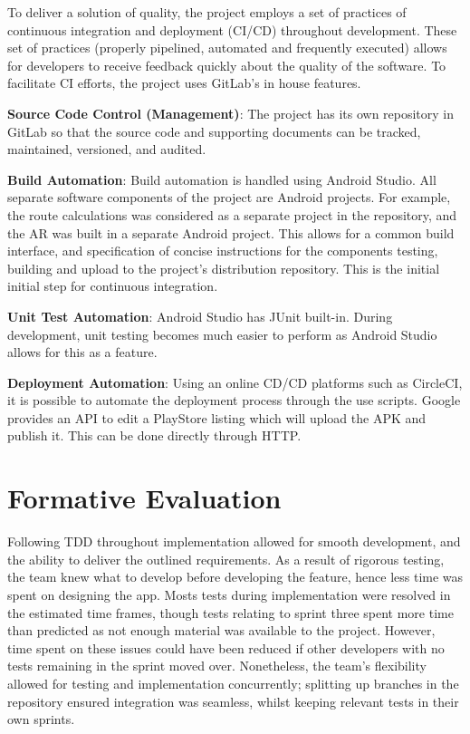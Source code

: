 To deliver a solution of quality, the project employs a set of practices of continuous integration and deployment (CI/CD) throughout development. These set of practices (properly pipelined, automated and frequently executed) allows for developers to receive feedback quickly about the quality of the software. To facilitate CI efforts, the project uses GitLab's in house features.

\textbf{Source Code Control (Management)}: The project has its own repository in GitLab so that the source code and supporting documents can be tracked, maintained, versioned, and audited.

\textbf{Build Automation}: Build automation is handled using Android Studio. All separate software components of the project are Android projects. For example, the route calculations was considered as a separate project in the repository, and the AR was built in a separate Android project. This allows for a common build interface, and specification of concise instructions for the components testing, building and upload to the project's distribution repository. This is the initial initial step for continuous integration.

\textbf{Unit Test Automation}: Android Studio has JUnit built-in. During development, unit testing becomes much easier to perform as Android Studio allows for this as a feature.

\textbf{Deployment Automation}: Using an online CD/CD platforms such as CircleCI, it is possible to automate the deployment process through the use scripts. Google provides an API to edit a PlayStore listing which will upload the APK and publish it. This can be done directly through HTTP.

\section{Formative Evaluation}
Following TDD throughout implementation allowed for smooth development, and the ability to deliver the outlined requirements. As a result of rigorous testing, the team knew what to develop before developing the feature, hence less time was spent on designing the app. Mosts tests during implementation were resolved in the estimated time frames, though tests relating to sprint three spent more time than predicted as not enough material was available to the project. However, time spent on these issues could have been reduced if other developers with no tests remaining in the sprint moved over. Nonetheless, the team's flexibility allowed for testing and implementation concurrently; splitting up branches in the repository ensured integration was seamless, whilst keeping relevant tests in their own sprints.


